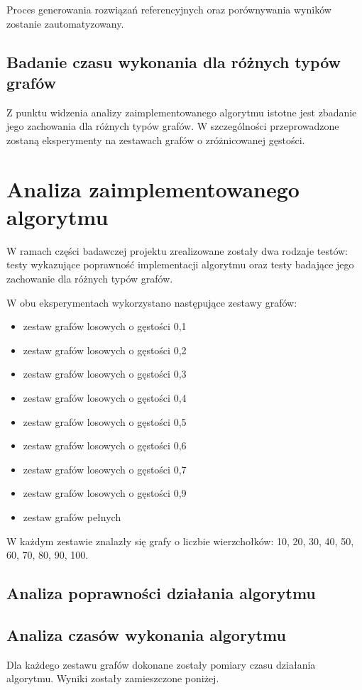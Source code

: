 \documentclass[12pt, a4paper]{article}
\begin{document}
Proces generowania rozwiązań referencyjnych oraz porównywania wyników zostanie zautomatyzowany.
\subsection{Badanie czasu wykonania dla różnych typów grafów}
Z punktu widzenia analizy zaimplementowanego algorytmu istotne jest zbadanie jego zachowania dla różnych typów grafów. W szczególności przeprowadzone zostaną eksperymenty na zestawach grafów o zróżnicowanej gęstości.

\section{Analiza zaimplementowanego algorytmu}
W ramach części badawczej projektu zrealizowane zostały dwa rodzaje testów: testy wykazujące poprawność implementacji algorytmu oraz testy badające jego zachowanie dla różnych typów grafów.

W obu eksperymentach wykorzystano następujące zestawy grafów:
\begin{itemize}
	\item zestaw grafów losowych o gęstości 0,1
	\item zestaw grafów losowych o gęstości 0,2
	\item zestaw grafów losowych o gęstości 0,3
	\item zestaw grafów losowych o gęstości 0,4
	\item zestaw grafów losowych o gęstości 0,5
	\item zestaw grafów losowych o gęstości 0,6
	\item zestaw grafów losowych o gęstości 0,7
	\item zestaw grafów losowych o gęstości 0,9
	\item zestaw grafów pełnych
\end{itemize}
W każdym zestawie znalazły się grafy o liczbie wierzchołków: 10, 20, 30, 40, 50, 60, 70, 80, 90, 100.
\subsection{Analiza poprawności działania algorytmu}
\subsection{Analiza czasów wykonania algorytmu}
Dla każdego zestawu grafów dokonane zostały pomiary czasu działania algorytmu. Wyniki zostały zamieszczone poniżej.
\end{document}
